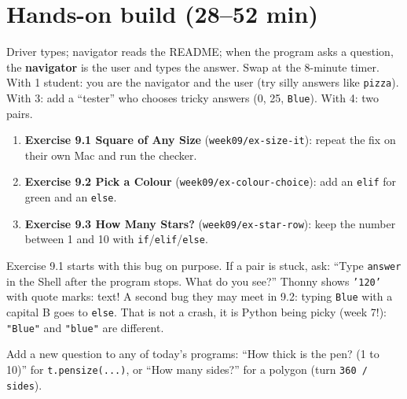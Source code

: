 \section{Hands-on build (28--52 min)}
\begin{pairroles}
Driver types; navigator reads the README; when the program asks a question, the \textbf{navigator} is the user and types the answer. Swap at the 8-minute timer.
With 1 student: you are the navigator and the user (try silly answers like \texttt{pizza}). With 3: add a \enquote{tester} who chooses tricky answers (0, 25, \texttt{Blue}). With 4: two pairs.
\end{pairroles}
\begin{enumerate}[leftmargin=1.4em,itemsep=2pt]
  \item \textbf{Exercise 9.1 Square of Any Size} (\texttt{week09/ex-size-it}): repeat the fix on their own Mac and run the checker.
  \item \textbf{Exercise 9.2 Pick a Colour} (\texttt{week09/ex-colour-choice}): add an \texttt{elif} for green and an \texttt{else}.
  \item \textbf{Exercise 9.3 How Many Stars?} (\texttt{week09/ex-star-row}): keep the number between 1 and 10 with \texttt{if}/\texttt{elif}/\texttt{else}.
\end{enumerate}
\begin{bughunt}
Exercise 9.1 starts with this bug on purpose. If a pair is stuck, ask: \enquote{Type \texttt{answer} in the Shell after the program stops. What do you see?} Thonny shows \texttt{'120'} with quote marks: text! A second bug they may meet in 9.2: typing \texttt{Blue} with a capital B goes to \texttt{else}. That is not a crash, it is Python being picky (week 7!): \texttt{"Blue"} and \texttt{"blue"} are different.
\end{bughunt}
\begin{freebuild}
Add a new question to any of today's programs: \enquote{How thick is the pen? (1 to 10)} for \texttt{t.pensize(...)}, or \enquote{How many sides?} for a polygon (turn \texttt{360 / sides}).
\end{freebuild}


